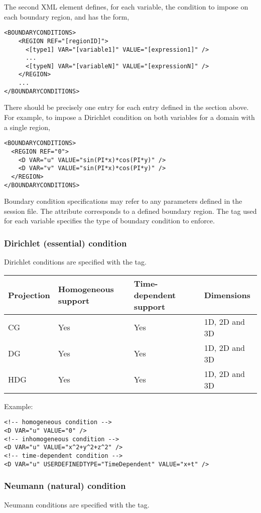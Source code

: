 The second XML element defines, for each variable, the condition to impose on
each boundary region, and has the form,
\begin{lstlisting}[style=XMLStyle]
<BOUNDARYCONDITIONS>
    <REGION REF="[regionID]">
      <[type1] VAR="[variable1]" VALUE="[expression1]" />
      ...
      <[typeN] VAR="[variableN]" VALUE="[expressionN]" />
    </REGION>
    ...
</BOUNDARYCONDITIONS>
\end{lstlisting}
There should be precisely one  entry for each  entry
defined in the  section above. For example, to impose a
Dirichlet condition on both variables for a domain with a single region, 
\begin{lstlisting}[style=XMLStyle] 
<BOUNDARYCONDITIONS>
  <REGION REF="0">
    <D VAR="u" VALUE="sin(PI*x)*cos(PI*y)" /> 
    <D VAR="v" VALUE="sin(PI*x)*cos(PI*y)" />
  </REGION>
</BOUNDARYCONDITIONS>
\end{lstlisting}
Boundary condition specifications may refer to any parameters defined in the
session file. The  attribute corresponds to a defined boundary
region. The tag used for each variable specifies the type of boundary condition
to enforce.

\subsubsection{Dirichlet (essential) condition}
Dirichlet conditions are specified with the  tag.

\begin{tabular}{llll}
Projection & Homogeneous support & Time-dependent support & Dimensions \\
\toprule
CG & Yes & Yes & 1D, 2D and 3D \\
DG & Yes & Yes & 1D, 2D and 3D \\
HDG& Yes & Yes & 1D, 2D and 3D
\end{tabular}

Example:
\begin{lstlisting}[style=XMLStyle]
<!-- homogeneous condition -->
<D VAR="u" VALUE="0" />
<!-- inhomogeneous condition -->
<D VAR="u" VALUE="x^2+y^2+z^2" />
<!-- time-dependent condition -->
<D VAR="u" USERDEFINEDTYPE="TimeDependent" VALUE="x+t" />
\end{lstlisting}

\subsubsection{Neumann (natural) condition}
Neumann conditions are specified with the  tag.

